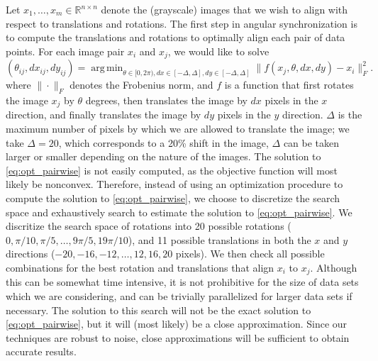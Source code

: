 \documentclass[12pt]{article}
\DeclareMathOperator*{\argmin}{arg\,min}
\begin{document}
Let $x_1, \dots, x_m \in \mathbb{R}^{n \times n}$ denote the (grayscale) images that we wish to align with respect to translations and rotations.
%
The first step in angular synchronization is to compute the translations and rotations to optimally align each pair of data points. 
%
For each image pair $x_i$ and $x_j$, we would like to solve
\begin{equation}\label{eq:opt_pairwise}
(\theta_{ij}, dx_{ij}, dy_{ij}) = \argmin_{\theta \in [0, 2\pi), dx \in [-\Delta, \Delta], dy \in [-\Delta, \Delta]} \|f(x_j, \theta, dx, dy) - x_i \|_F^2.
\end{equation}
where $\| \cdot \|_F$ denotes the Frobenius norm, and $f$ is a function that first rotates the image $x_j$ by $\theta$ degrees, then translates the image by $dx$ pixels in the $x$ direction, and finally translates the image by $dy$ pixels in the $y$ direction. 
%
$\Delta$ is the maximum number of pixels by which we are allowed to translate the image; we take $\Delta=20$, which corresponds to a 20\% shift in the image, $\Delta$ can be taken larger or smaller depending on the nature of the images. 
%
The solution to \eqref{eq:opt_pairwise} is not easily computed, as the objective function will most likely be nonconvex.
%
Therefore, instead of using an optimization procedure to compute the solution to \eqref{eq:opt_pairwise}, we choose to discretize the search space and exhaustively search to estimate the solution to \eqref{eq:opt_pairwise}.
%
We discritize the search space of rotations into 20 possible rotations ($0, \pi/10, \pi/5, \dots, 9 \pi/5, 19\pi/10$), and 11 possible translations in both the $x$ and $y$ directions ($-20, -16, -12, \dots, 12, 16, 20$ pixels). 
%
We then check all possible combinations for the best rotation and translations that align $x_i$ to $x_j$. 
%
Although this can be somewhat time intensive, it is not prohibitive for the size of data sets which we are considering, and can be trivially parallelized for larger data sets if necessary.
%
The solution to this search will not be the exact solution to \eqref{eq:opt_pairwise}, but it will (most likely) be a close approximation.
%
Since our techniques are robust to noise, close approximations will be sufficient to obtain accurate results.
\end{document}
